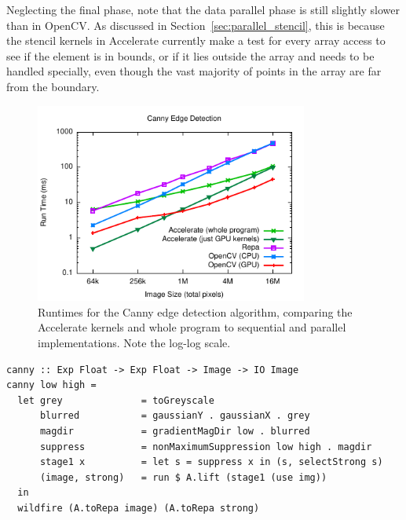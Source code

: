 Neglecting the final phase, note that the data parallel phase is still slightly
slower than in OpenCV. As discussed in Section~\ref{sec:parallel_stencil}, this
is because the stencil kernels in Accelerate currently make a test for every
array access to see if the element is in bounds, or if it lies outside the array
and needs to be handled specially, even though the vast majority of points in
the array are far from the boundary.

\begin{figure}
    \begin{center}
        \includegraphics[width=0.8\textwidth]{images/results/canny/canny}
    \end{center}
    \caption[Canny edge detection benchmarks]{Runtimes for the Canny edge
        detection algorithm, comparing the Accelerate kernels and whole program
        to sequential and parallel implementations. Note the log-log scale.}
    \label{fig:canny}
\end{figure}

\begin{lstlisting}[style=haskell_float
    ,label=lst:canny
    ,caption={The Canny edge detection algorithm}]
canny :: Exp Float -> Exp Float -> Image -> IO Image
canny low high =
  let grey              = toGreyscale
      blurred           = gaussianY . gaussianX . grey
      magdir            = gradientMagDir low . blurred
      suppress          = nonMaximumSuppression low high . magdir
      stage1 x          = let s = suppress x in (s, selectStrong s)
      (image, strong)   = run $ A.lift (stage1 (use img))
  in
  wildfire (A.toRepa image) (A.toRepa strong)
\end{lstlisting}

